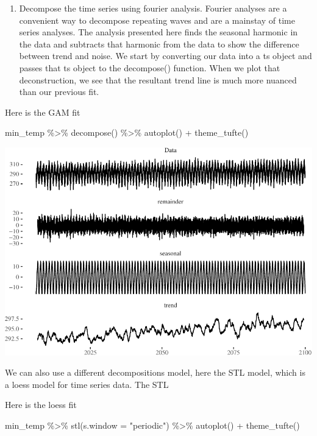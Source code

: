 \documentclass[
  paper=a4,
  ,captions=tableheading
]{scrartcl}
\newenvironment{Shaded}{\begin{snugshade}}{\end{snugshade}}
\newcommand{\AttributeTok}[1]{\textcolor[rgb]{0.77,0.63,0.00}{#1}}
\newcommand{\FunctionTok}[1]{\textcolor[rgb]{0.00,0.00,0.00}{#1}}
\newcommand{\NormalTok}[1]{#1}
\newcommand{\SpecialCharTok}[1]{\textcolor[rgb]{0.00,0.00,0.00}{#1}}
\newcommand{\StringTok}[1]{\textcolor[rgb]{0.31,0.60,0.02}{#1}}
\providecommand{\tightlist}{%
  \setlength{\itemsep}{0pt}\setlength{\parskip}{0pt}}
\begin{document}
\begin{enumerate}
\def\labelenumi{\arabic{enumi}.}
\setcounter{enumi}{3}
\tightlist
\item
  Decompose the time series using fourier analysis. Fourier analyses are
  a convenient way to decompose repeating waves and are a mainstay of
  time series analyses. The analysis presented here finds the seasonal
  harmonic in the data and subtracts that harmonic from the data to show
  the difference between trend and noise. We start by converting our
  data into a ts object and passes that ts object to the decompose()
  function. When we plot that deconstruction, we see that the resultant
  trend line is much more nuanced than our previous fit.
\end{enumerate}

Here is the GAM fit

\begin{Shaded}
\begin{Highlighting}[]
\NormalTok{min\_temp }\SpecialCharTok{\%\textgreater{}\%}
  \FunctionTok{decompose}\NormalTok{() }\SpecialCharTok{\%\textgreater{}\%}
  \FunctionTok{autoplot}\NormalTok{() }\SpecialCharTok{+} \FunctionTok{theme\_tufte}\NormalTok{()}
\end{Highlighting}
\end{Shaded}

\includegraphics{Haskell_files/figure-latex/unnamed-chunk-54-1.pdf}

We can also use a different decompositions model, here the STL model,
which is a loess model for time series data. The STL

Here is the loess fit

\begin{Shaded}
\begin{Highlighting}[]
\NormalTok{min\_temp }\SpecialCharTok{\%\textgreater{}\%}
 \FunctionTok{stl}\NormalTok{(}\AttributeTok{s.window =} \StringTok{"periodic"}\NormalTok{) }\SpecialCharTok{\%\textgreater{}\%}
  \FunctionTok{autoplot}\NormalTok{() }\SpecialCharTok{+} \FunctionTok{theme\_tufte}\NormalTok{()}
\end{Highlighting}
\end{Shaded}
\end{document}
